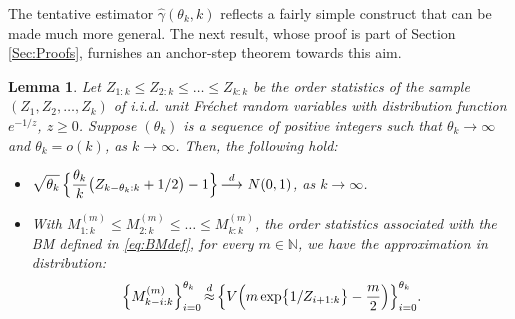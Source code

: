 \documentclass[11pt, a4paper, oneside]{article}
\numberwithin{equation}{section}
\theoremstyle{plain}
\newtheorem{lem}[thm]{Lemma}
\theoremstyle{definition}
\newcommand{\field}[1]{\mathbb{#1}}
\newcommand{\conv}[1]{\ensuremath{\, \displaystyle {\mathop{\longrightarrow}^{#1}}}\, }
\begin{document}
The tentative estimator $\hat{\gamma}(\theta_k, k)$  reflects a fairly simple construct that can be made much more general. The next result, whose proof is part of Section \ref{Sec:Proofs}, furnishes an anchor-step theorem towards this aim.

\begin{lem}\label{Lem:UnitFrechetOS}
Let $Z_{1:k} \leq Z_{2:k}\leq \ldots \leq Z_{k:k}$ be the order statistics of the sample $(Z_1, Z_2, \ldots, Z_k)$ of i.i.d. unit Fr\'echet random variables with distribution function $e^{-1/z}$, $z \geq 0$. Suppose $(\theta_k)$ is a sequence of positive integers such that $\theta_k \rightarrow\infty$ and $\theta_k=o(k)$, as $k \rightarrow \infty$. Then, the following hold:
\begin{itemize}
    \item[(i)] $\displaystyle{ \sqrt{\theta_k} \, \Bigl\{ \frac{\theta_k}{k}  \bigl(Z_{k - \theta_k :k} + 1/2 \bigr)-1 \Bigr\} \conv{d} \, N(0,1) }$, as $k \rightarrow \infty$.
     \item[(ii)] With $M^{(m)}_{1:k} \leq M^{(m)}_{2:k}\leq \ldots \leq M^{(m)}_{k:k} $, the order statistics associated with the BM defined in \eqref{eq:BMdef}, for every $m \in \field{N}$, we have the approximation in distribution:
     \begin{equation*}
         \Bigl\{  M^{(m)}_{k-i:k} \Bigr\}_{i=0}^{\theta_k} \mathop{\approx}^d \,  \Bigl\{ V\Bigl( m \exp\bigl\{1/Z_{i+1:k} \bigr\} -\frac{m}{2}\Bigr) \Bigr\}_{i=0}^{\theta_k}.
     \end{equation*}
\end{itemize}
\end{lem}
\end{document}
